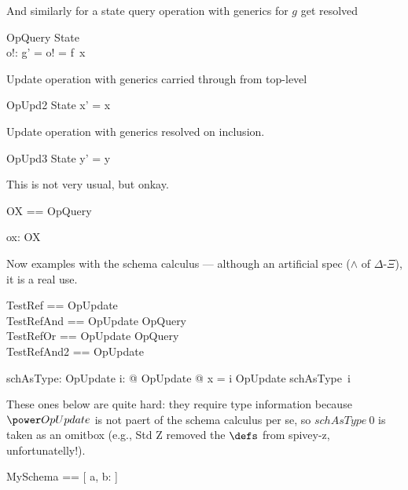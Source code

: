 \documentclass{article}
\begin{document}
And similarly for a state query operation with generics for $g$ get resolved
\begin{schema}{OpQuery}
  \Xi State \\
  o!: \nat
\where
   g' = o! = f~x
\end{schema}

Update operation with generics carried through from top-level
\begin{schema}{OpUpd2}%
   \Delta State%
\where
    x' = x 
\end{schema}

Update operation with generics resolved on inclusion.
\begin{schema}{OpUpd3}
   \Delta State%
\where
    y' = y 
\end{schema}

This is not very usual, but onkay.
\begin{zed}
   OX == \pre OpQuery
\end{zed}

\begin{axdef}
   ox: OX
\end{axdef}

Now examples with the schema calculus --- although an artificial spec ($\land$ of $\Delta$-$\Xi$), it is a real use.
\begin{zed}
   TestRef     == OpUpdate \\
   TestRefAnd  == OpUpdate \land OpQuery \\
   TestRefOr   == OpUpdate \lor OpQuery \\
   TestRefAnd2 == OpUpdate \land [ v: \nat ]
\end{zed}

\begin{axdef}
   schAsType: \nat \fun \power OpUpdate
\where
   \forall i: \nat @ \exists OpUpdate @ x = i \land \theta OpUpdate \in schAsType~i 
\end{axdef}

These ones below are quite hard: they require type information because $\power OpUpdate$ 
is not paert of the schema calculus per se, so $schAsType~0$ is taken as an omitbox
(e.g., Std Z removed the $\defs$ from spivey-z, unfortunatelly!).
%

\begin{zed}
   MySchema == [ a, b: \nat ]
\end{zed}
\end{document}
